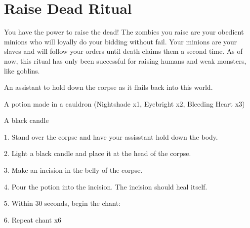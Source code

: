\documentclass[green]{guildcamp2}
\begin{document}
\name{\gRaiseDead{}}

\section{Raise Dead Ritual}

You have the power to raise the dead! The zombies you raise are your obedient minions who will loyally do your bidding without fail. Your minions are your slaves and will follow your orders until death claims them a second time. As of now, this ritual has only been successful for raising humans and weak monsters, like goblins. 

\begin{enum}[Requirements]
	\item An assistant to hold down the corpse as it flails back into this world.
	\item A potion made in a cauldron (Nightshade x1, Eyebright x2, Bleeding Heart x3)
	\item A black candle
	
\end{enum}

\begin{enum}[Directions]
	\item 1. Stand over the corpse and have your assisstant hold down the body.
	\item 2. Light a black candle and place it at the head of the corpse.
	\item 3. Make an incision in the belly of the corpse.
	\item 4. Pour the potion into the incision. The incision should heal itself.
	\item 5. Within 30 seconds, begin the chant:
	
	
	\item 6. Repeat chant x6
\end{enum}
	
\end{document}
